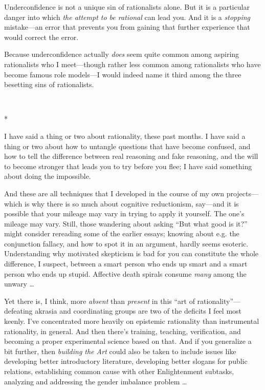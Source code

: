 {
 Underconfidence is not a unique sin of rationalists alone. But it
is a particular danger into which \textit{the attempt to be rational}
can lead you. And it is a \textit{stopping} mistake---an error that
prevents you from gaining that further experience that would correct
the error.}

{
 Because underconfidence actually \textit{does} seem quite common
among aspiring rationalists who I meet---though rather less common
among rationalists who have become famous role models---I would indeed
name it third among the three besetting sins of rationalists.}

{\centering
 \ ~
\par}

{\centering
 *
\par}


{
 I have said a thing or two about rationality, these past months. I
have said a thing or two about how to untangle questions that have
become confused, and how to tell the difference between real reasoning
and fake reasoning, and the will to become stronger that leads you to
try before you flee; I have said something about doing the impossible.
}

{
 And these are all techniques that I developed in the course of my
own projects---which is why there is so much about cognitive
reductionism, say---and it is possible that your mileage may vary in
trying to apply it yourself. The one's mileage may
vary. Still, those wandering about asking ``But what
good is it?'' might consider rereading some of the
earlier essays; knowing about e.g. the conjunction fallacy, and how to
spot it in an argument, hardly seems esoteric. Understanding why
motivated skepticism is bad for you can constitute the whole
difference, I suspect, between a smart person who ends up smart and a
smart person who ends up stupid. Affective death spirals consume
\textit{many} among the unwary \ldots}

{
 Yet there is, I think, more \textit{absent} than \textit{present}
in this ``art of
rationality''---defeating akrasia and coordinating
groups are two of the deficits I feel most keenly. I've
concentrated more heavily on epistemic rationality than instrumental
rationality, in general. And then there's training,
teaching, verification, and becoming a proper experimental science
based on that. And if you generalize a bit further, then
\textit{building the Art} could also be taken to include issues like
developing better introductory literature, developing better slogans
for public relations, establishing common cause with other
Enlightenment subtasks, analyzing and addressing the gender imbalance
problem \ldots}

